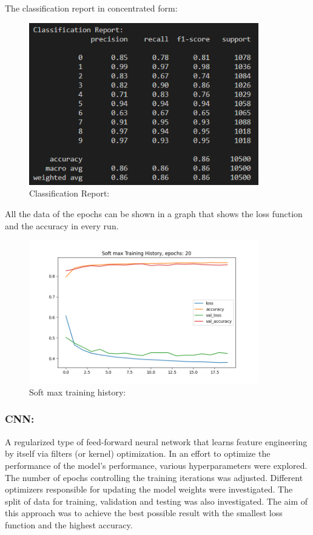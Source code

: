 \documentclass{article}
\begin{document}
The classification report in concentrated form:
\begin{figure}[H]
    \caption{Classification Report:}
    \centering
    \includegraphics[width=10cm]{imgFolder/classificationReportSoftmax.png}
\end{figure}

All the data of the epochs can be shown in a graph that shows the loss function and the accuracy in every run.
\begin{figure}[H]
    \caption{Soft max training history:}
    \centering
    \includegraphics[width=10cm]{imgFolder/softMax_fig.png}
\end{figure}


\subsubsection{CNN:}
A regularized type of feed-forward neural network that learns feature engineering by itself via filters (or kernel) optimization.
In an effort to optimize the performance of the model's performance, various hyperparameters were explored.
The number of epochs controlling the training iterations was adjusted. Different optimizers responsible for updating the model weights were investigated. The split of data for training, validation and testing was also investigated.
The aim of this approach was to achieve the best possible result with the smallest loss function and the highest accuracy.
\end{document}
